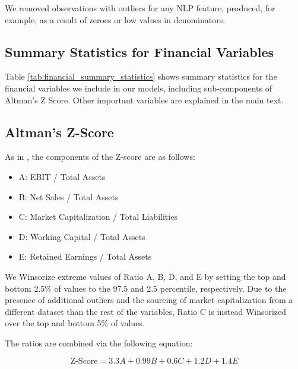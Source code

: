 \documentclass{article}[11pt]
\begin{document}
    We removed observations with outliers for any NLP feature, produced, for example, as a result of zeroes or low values in denominators.

    \clearpage
    \newpage

    \subsection{Summary Statistics for Financial Variables}

    Table \ref{tab:financial_summary_statistics} shows summary statistics for the financial variables we include in our models, including sub-components of Altman's Z Score. Other important variables are explained in the main text.

    

    \clearpage
    \newpage

    \subsection{Altman's Z-Score}

    \label{sec:altman-z-score}

    As in \cite{das_credit_2023}, the components of the Z-score are as follows:

    \begin{itemize}
        \item A: EBIT / Total Assets
        \item B: Net Sales / Total Assets
        \item C: Market Capitalization / Total Liabilities
        \item D: Working Capital / Total Assets
        \item E: Retained Earnings / Total Assets
    \end{itemize}

    We Winsorize extreme values of Ratio A, B, D, and E by setting the top and bottom 2.5\% of values to the 97.5 and 2.5 percentile, respectively. Due to the presence of additional outliers and the sourcing of market capitalization from a different dataset than the rest of the variables, Ratio C is instead Winsorized over the top and bottom 5\% of values. 

    The ratios are combined via the following equation:

    \begin{equation*}
        \text{Z-Score} = 3.3 A + 0.99 B + 0.6 C + 1.2 D + 1.4 E
    \end{equation*}
\end{document}
